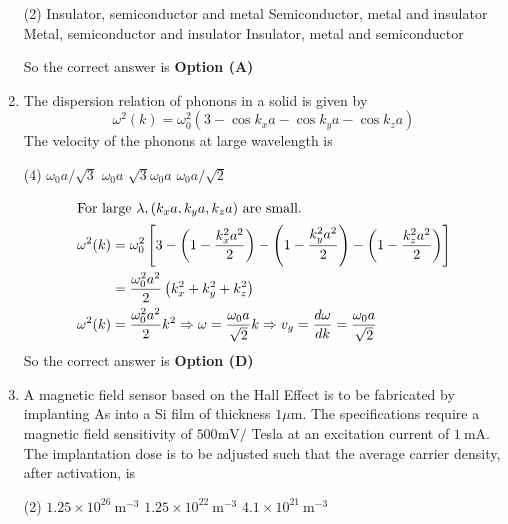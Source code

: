 \begin{enumerate}
\begin{figure}[H]
\end{figure}
\begin{tasks}(2)
\task[\textbf{A.}]  Insulator, semiconductor and metal
\task[\textbf{B.}]  Semiconductor, metal and insulator
\task[\textbf{C.}] Metal, semiconductor and insulator
\task[\textbf{D.}] Insulator, metal and semiconductor
\end{tasks}
\begin{answer}
So the correct answer is \textbf{Option (A)}
\end{answer}
	\item The dispersion relation of phonons in a solid is given by
	$$
	\omega^{2}(k)=\omega_{0}^{2}\left(3-\cos k_{x} a-\cos k_{y} a-\cos k_{z} a\right)
	$$
	The velocity of the phonons at large wavelength is
	{}
\begin{tasks}(4)
\task[\textbf{A.}] $\omega_{0} a / \sqrt{3}$
\task[\textbf{B.}] $\omega_{0} a$
\task[\textbf{C.}] $\sqrt{3} \omega_{0} a$
\task[\textbf{D.}] $\omega_{0} a / \sqrt{2}$
\end{tasks}
\begin{answer}
\begin{align*}
\intertext{For large $\lambda,\left(k_{x} a, k_{y} a, k_{z} a\right)$ are small.}
\omega^{2}(k)&=\omega_{0}^{2}\left[3-\left(1-\frac{k_{x}^{2} a^{2}}{2}\right)-\left(1-\frac{k_{y}^{2} a^{2}}{2}\right)-\left(1-\frac{k_{z}^{2} a^{2}}{2}\right)\right]\\&=\frac{\omega_{0}^{2} a^{2}}{2}\left(k_{x}^{2}+k_{y}^{2}+k_{z}^{2}\right)\\
\omega^{2}(k)&=\frac{\omega_{0}^{2} a^{2}}{2} k^{2} \Rightarrow \omega=\frac{\omega_{0} a}{\sqrt{2}} k \Rightarrow v_{g}=\frac{d \omega}{d k}=\frac{\omega_{0} a}{\sqrt{2}}
\end{align*}
So the correct answer is \textbf{Option (D)}
\end{answer}
	\item A magnetic field sensor based on the Hall Effect is to be fabricated by implanting As into a Si film of thickness $1 \mu \mathrm{m}$. The specifications require a magnetic field sensitivity of $500 \mathrm{mV} /$ Tesla at an excitation current of $1 \mathrm{~mA}$. The implantation dose is to be adjusted such that the average carrier density, after activation, is
	{}
\begin{tasks}(2)
\task[\textbf{A.}] $1.25 \times 10^{26} \mathrm{~m}^{-3}$
\task[\textbf{B.}] $1.25 \times 10^{22} \mathrm{~m}^{-3}$
\task[\textbf{C.}] $4.1 \times 10^{21} \mathrm{~m}^{-3}$

\end{tasks}
\end{enumerate}
